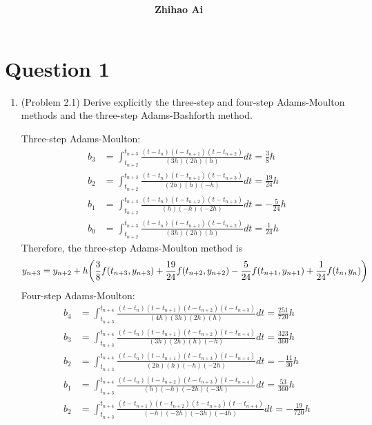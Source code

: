 \documentclass[10pt]{report}
\title{
	\vspace{2in}
	\textmd{\textbf{\hwCourse\\\hwTitle}}\\
	\vspace{0.3in}\large{\textit{\hmwkClassInstructor}}
	\vspace{3in}
}
\author{\textbf{Zhihao Ai}}
\date{}
\newcommand{\dintt}[4] {\int_{#1}^{#2} #3 d#4}
\DeclarePairedDelimiter\autoparen{(}{)}
\newcommand{\pa}[1]{\autoparen*{#1}}
\begin{document}
\maketitle

\section*{Question 1}
\begin{enumerate}
	\item 
	(Problem 2.1) Derive explicitly the three-step and four-step Adams-Moulton methods and the three-step Adams-Bashforth method.
	
	Three-step Adams-Moulton:
	\begin{align*}
		b_3 &= \dintt{t_{n+2}}{t_{n+3}}{
			\frac{ (t-t_{n})(t-t_{n+1})(t-t_{n+2}) }{ (3h)(2h)(h) }}{t}
		= \frac{3}{8}h\\
		b_2 &= \dintt{t_{n+2}}{t_{n+3}}{
			\frac{ (t-t_{n})(t-t_{n+1})(t-t_{n+3}) }{ (2h)(h)(-h) }}{t}
		= \frac{19}{24}h\\
		b_1 &= \dintt{t_{n+2}}{t_{n+3}}{
			\frac{ (t-t_{n})(t-t_{n+2})(t-t_{n+3}) }{ (h)(-h)(-2h) }}{t}
		= -\frac{5}{24}h\\
		b_0 &= \dintt{t_{n+2}}{t_{n+3}}{
			\frac{ (t-t_{n})(t-t_{n+1})(t-t_{n+2}) }{ (3h)(2h)(h) }}{t}
		= \frac{1}{24}h
	\end{align*}
	Therefore, the three-step Adams-Moulton method is
	\[
	y_{n+3} = y_{n+2} + h \pa{\frac{3}{8} f(t_{n+3},y_{n+3}) + \frac{19}{24} f(t_{n+2},y_{n+2}) - \frac{5}{24} f(t_{n+1},y_{n+1}) + \frac{1}{24} f(t_n,y_n)}
	\]
	Four-step Adams-Moulton:
	\begin{align*}
	b_4 &= \dintt{t_{n+3}}{t_{n+4}}{
		\frac{ (t-t_{n})(t-t_{n+1})(t-t_{n+2})(t-t_{n+3}) }{ (4h)(3h)(2h)(h) }}{t}
	= \frac{251}{720}h\\
	b_3 &= \dintt{t_{n+3}}{t_{n+4}}{
		\frac{ (t-t_{n})(t-t_{n+1})(t-t_{n+2})(t-t_{n+4}) }{ (3h)(2h)(h)(-h) }}{t}
	= \frac{323}{360}h\\
	b_2 &= \dintt{t_{n+3}}{t_{n+4}}{
		\frac{ (t-t_{n})(t-t_{n+1})(t-t_{n+3})(t-t_{n+4}) }{ (2h)(h)(-h)(-2h) }}{t}
	= -\frac{11}{30}h\\
	b_1 &= \dintt{t_{n+3}}{t_{n+4}}{
		\frac{ (t-t_{n})(t-t_{n+2})(t-t_{n+3})(t-t_{n+4}) }{ (h)(-h)(-2h)(-3h) }}{t}
	= \frac{53}{360}h\\
	b_2 &= \dintt{t_{n+3}}{t_{n+4}}{
		\frac{ (t-t_{n+1})(t-t_{n+2})(t-t_{n+3})(t-t_{n+4}) }{ (-h)(-2h)(-3h)(-4h) }}{t}
	= -\frac{19}{720}h
	\end{align*}

\end{enumerate}
\end{document}
